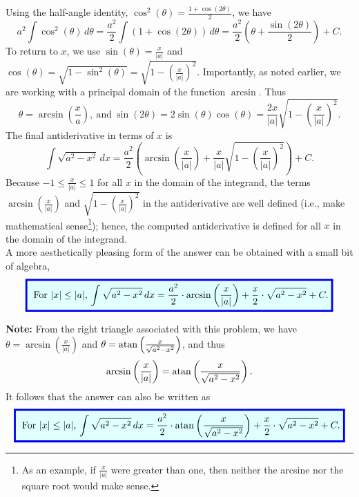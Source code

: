 
Using the half-angle identity, \( \cos^2(\theta) = \frac{1 + \cos(2\theta)}{2} \), we have
\[
a^2 \int \cos^2(\theta)\, d\theta = \frac{a^2}{2} \int (1 + \cos(2\theta)) \, d\theta = \frac{a^2}{2} \left( \theta + \frac{\sin(2\theta)}{2} \right) + C.
\]
To return to \( x \), we use \( \sin(\theta) = \frac{x}{|a|} \) and \( \cos(\theta) = \sqrt{1 - \sin^2(\theta)} = \sqrt{1 - \left(  \frac{x}{|a|}\right)^2}\). Importantly, as noted earlier, we are working with a principal domain of the function $\arcsin$. Thus
\[
\theta = \arcsin\left(\frac{x}{a}\right),~\text{and}~\sin(2\theta) = 2\sin(\theta)\cos(\theta) = \frac{2x}{|a|}\sqrt{1 - \left(\frac{x}{|a|}\right)^2}.
\]
The final antiderivative in terms of \( x \) is
\[
\int \sqrt{a^2 - x^2} \, dx = \frac{a^2}{2} \left( \arcsin\left(\frac{x}{|a|}\right) + \frac{x}{|a|}\sqrt{1 - \left(\frac{x}{|a|}\right)^2} \right) + C.
\]
Because $-1 \le \frac{x}{|a|} \le 1$ for all $x$ in the domain of the integrand, the terms $\arcsin\left(\frac{x}{|a|} \right)$ and $\sqrt{1 - \left(\frac{x}{|a|}\right)^2}$ in the antiderivative are well defined (i.e., make mathematical sense\footnote{As an example, if $\frac{x}{|a|}$ were greater than one, then neither the arcsine nor the square root would make sense.}); hence, the computed antiderivative is defined for all $x$ in the domain of the integrand.\\

A more aesthetically pleasing form of the answer can be obtained with a small bit of algebra, 
\[
\setlength{\fboxrule}{2pt} %
\fcolorbox{brightblue}{lightblue}{%
\addtolength{\fboxsep}{5pt} %
For $|x|\le |a|$, $\displaystyle
\int \sqrt{a^2 - x^2} \, dx =  \frac{a^2}{2} \cdot \arcsin\left(\frac{x}{|a|} \right) + \frac{x}{2} \cdot \sqrt{a^2 - x^2} + C.
$%
}
\]

\textbf{Note:} From the right triangle associated with this problem, we have $\theta = \arcsin\left(\frac{x}{|a|}\right)$ and $\theta =\mathrm{atan}\left(\frac{x}{\sqrt{a^2 - x^2}}\right)$, and thus 
$$ \arcsin\left(\frac{x}{|a|}\right) =\mathrm{atan}\left(\frac{x}{\sqrt{a^2 - x^2}}\right). $$ It follows that the answer can also be written as 
\[
\setlength{\fboxrule}{2pt} %
\fcolorbox{brightblue}{lightblue}{%
\addtolength{\fboxsep}{5pt} %
For $|x|\le |a|$, $\displaystyle
\int \sqrt{a^2 - x^2} \, dx =   \frac{a^2}{2} \cdot \atan\left(\frac{x}{\sqrt{a^2 - x^2}}\right) + \frac{x}{2} \cdot \sqrt{a^2 - x^2} + C.
$%
}
\]
\Qed
\bigskip


